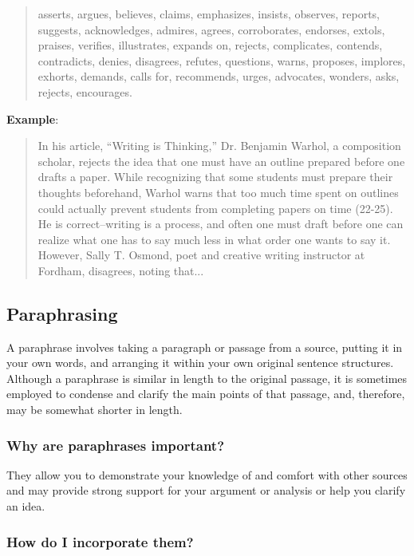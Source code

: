 \documentclass[12pt, hidelinks]{article} %
\begin{document}
\begin{quote}asserts, argues, believes, claims, emphasizes, insists, observes, reports, suggests, acknowledges, admires, agrees, corroborates, endorses, extols, praises, verifies, illustrates, expands on, rejects, complicates, contends, contradicts, denies, disagrees, refutes, questions, warns, proposes, implores, exhorts, demands, calls for, recommends, urges, advocates, wonders, asks, rejects, encourages.\end{quote}
 
 
\textbf{Example}:
 
 \begin{quote}
In his article, ``Writing is Thinking,'' Dr. Benjamin Warhol, a composition scholar, rejects the idea that one must have an outline prepared before one drafts a paper. While recognizing that some students must prepare their thoughts beforehand, Warhol warns that too much time spent on outlines could actually prevent students from completing papers on time (22-25). He is correct--writing  is a process, and often one must draft before one  can realize what one has to say much less in what order one wants to say it. However, Sally T. Osmond, poet and  creative writing instructor at Fordham, disagrees, noting that... \end{quote}

\subsection{Paraphrasing}

A paraphrase involves taking a paragraph or passage from a source, putting it in your own words, and arranging it within your own original sentence structures. Although a paraphrase is similar in length to the original passage, it is sometimes employed to condense and clarify the main points of that passage, and, therefore, may be somewhat shorter in length.

\subsubsection{Why are paraphrases important?}

They allow you to demonstrate your knowledge of and comfort with other sources and may provide strong support for your argument or analysis or help you clarify an idea.

\subsubsection{How do I incorporate them?}
\end{document}
